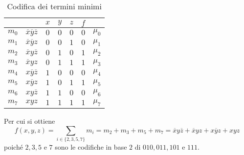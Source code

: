 \documentclass[a4paper]{extarticle}
\begin{document}
\begin{table}[H]
  \centering
  \begin{tabular}{c|c||ccc||c|c}
    $ $ & $ $ & $x$ & $y$ & $z$ & $f$\\
    \hline
    $m_0$ & $\overline{x}\overline{y}\overline{z}$ & $0$ & $0$ & $0$ & $0$ & $\mu_0$\\
    $m_1$ & $\overline{x}\overline{y}z$ & $0$ & $0$ & $1$ & $0$ & $\mu_1$\\
    $m_2$ & $\overline{x}y\overline{z}$ & $0$ & $1$ & $0$ & $1$ & $\mu_2$\\
    $m_3$ & $\overline{x}yz$ & $0$ & $1$ & $1$ & $1$ & $\mu_3$\\
    $m_4$ & $x\overline{y}\overline{z}$ & $1$ & $0$ & $0$ & $0$ & $\mu_4$\\
    $m_5$ & $x\overline{y}z$ & $1$ & $0$ & $1$ & $1$ & $\mu_5$\\
    $m_6$ & $xy\overline{z}$ & $1$ & $1$ & $0$ & $0$ & $\mu_6$\\
    $m_7$ & $xyz$ & $1$ & $1$ & $1$ & $1$ & $\mu_7$\\
  \end{tabular}
  \caption{Codifica dei termini minimi}
  \label{tab:codifica_termini_minimi}
\end{table}

\noindent
Per cui si ottiene
\[f(x, y, z) = \sum_{i \in \{2, 3, 5, 7\}} m_i = m_2 + m_3 + m_5 + m_7 = \overline{x}y\overline{z} + \overline{x}yz + x\overline{y}z + xyz\]
poiché \(2, 3, 5\) e \(7\) sono le codifiche in base \(2\) di \(010, 011, 101\) e \(111\).

\vspace{1em}
\end{document}
